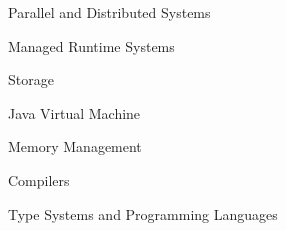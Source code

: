 
\begin{minipage}[t]{.33\linewidth}
  \begin{cvitems}
    \item Parallel and Distributed Systems
    \item Managed Runtime Systems
    \item Storage
  \end{cvitems}
\end{minipage}%
%
\hspace{20pt}
%
\begin{minipage}[t]{.33\linewidth}
  \begin{cvitems}
    \item Java Virtual Machine
    \item Memory Management
  \end{cvitems}
\end{minipage}%
%
\hspace{20pt}
%
\begin{minipage}[t]{.33\linewidth}
  \begin{cvitems}
    \item Compilers
    \item Type Systems and
	 Programming Languages
  \end{cvitems}
\end{minipage}%
%

\vspace{15pt}
